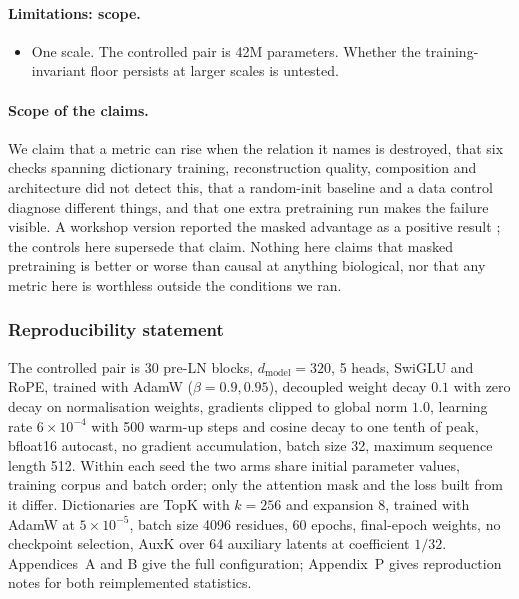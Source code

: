 \documentclass{article} %
\newcommand{\red}[1]{\textcolor{red}{#1}}
\newcommand{\opentag}[1]{\textcolor{red}{\textsuperscript{[\ref{#1}]}}}
\newcommand{\pend}[2]{\red{#1}\opentag{#2}}
\renewcommand{\red}[1]{#1}
\renewcommand{\opentag}[1]{}
\renewcommand{\pend}[2]{#1}
\begin{document}
\paragraph{Limitations: scope.}
\begin{itemize}[leftmargin=1.2em]
\item One scale. The controlled pair is 42M parameters. \pend{Whether the training-invariant floor
persists at larger scales is untested.}{n:onescale}
\end{itemize}

\paragraph{Scope of the claims.} We claim that a metric can rise when the relation it names is
destroyed, that six checks spanning dictionary training, reconstruction quality, composition and
architecture did not detect this, that a random-init baseline and a data control diagnose different
things, and that one extra pretraining run makes the failure visible. A workshop version reported
the masked advantage as a positive result \citep{gao2026structural}; the controls here supersede
that claim. Nothing here claims that masked pretraining is better or worse than causal at anything
biological, nor that any metric here is worthless outside the conditions we ran.

\subsubsection*{Reproducibility statement}

The controlled pair is 30 pre-LN blocks, $d_{\mathrm{model}} = 320$, 5 heads, SwiGLU and RoPE,
trained with AdamW ($\beta = 0.9, 0.95$), decoupled weight decay $0.1$ with zero decay on
normalisation weights, gradients clipped to global norm $1.0$, learning rate $6 \times 10^{-4}$
with 500 warm-up steps and cosine decay to one tenth of peak, bfloat16 autocast, no gradient
accumulation, batch size 32, maximum sequence length 512. Within each seed the two arms share
initial parameter values, training corpus and batch order; only the attention mask and the loss
built from it differ. Dictionaries are TopK with $k = 256$ and expansion 8, trained with AdamW at
$5 \times 10^{-5}$, batch size 4096 residues, 60 epochs, final-epoch weights, no checkpoint
selection, AuxK over 64 auxiliary latents at coefficient $1/32$. Appendices~A and B give the full
configuration; Appendix~P gives reproduction notes for both reimplemented statistics.
\end{document}

